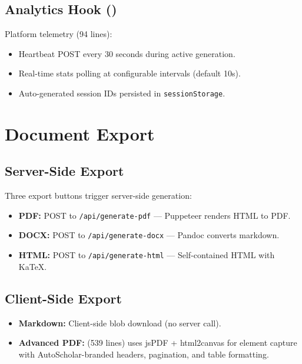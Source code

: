 \subsection{Analytics Hook ()}

Platform telemetry (94 lines):

\begin{itemize}
  \item Heartbeat POST every 30 seconds during active generation.
  \item Real-time stats polling at configurable intervals (default 10s).
  \item Auto-generated session IDs persisted in \texttt{sessionStorage}.
\end{itemize}

\section{Document Export}
\label{sec:frontend:export}

\subsection{Server-Side Export}

Three export buttons trigger server-side generation:

\begin{itemize}
  \item \textbf{PDF:} POST to \texttt{/api/generate-pdf} --- Puppeteer renders HTML to PDF.
  \item \textbf{DOCX:} POST to \texttt{/api/generate-docx} --- Pandoc converts markdown.
  \item \textbf{HTML:} POST to \texttt{/api/generate-html} --- Self-contained HTML with KaTeX.
\end{itemize}

\subsection{Client-Side Export}

\begin{itemize}
  \item \textbf{Markdown:} Client-side blob download (no server call).
  \item \textbf{Advanced PDF:}  (539 lines) uses jsPDF + html2canvas for element capture with AutoScholar-branded headers, pagination, and table formatting.
\end{itemize}

